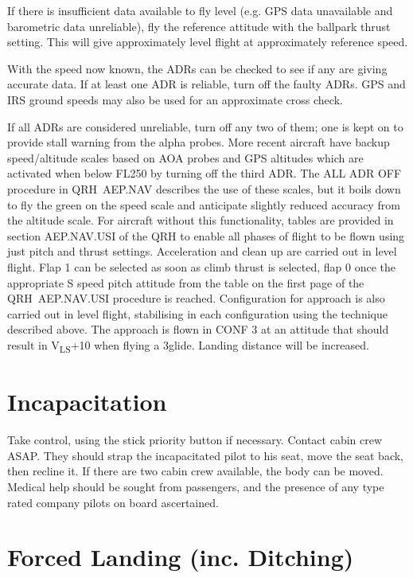 \documentclass[a5paper,11pt,twoside]{book}
\newcommand{\multicite}[1]{
  \nopagebreak
  \noindent{\footnotesize\color{blue}{[ #1 ]}}
}
\newcommand{\V}[1]{V\textsubscript{#1}}
\begin{document}
If there is insufficient data available to fly level (e.g. GPS data unavailable
and barometric data unreliable), fly the reference attitude with the ballpark
thrust setting. This will give approximately level flight at approximately
reference speed.

With the speed now known, the ADRs can be checked to see if any are giving
accurate data. If at least one ADR is reliable, turn off the faulty ADRs. GPS
and IRS ground speeds may also be used for an approximate cross check.

If all ADRs are considered unreliable, turn off any two of them; one is kept on
to provide stall warning from the alpha probes. More recent aircraft have backup
speed/altitude scales based on AOA probes and GPS altitudes which are activated
when below FL250 by turning off the third ADR. The ALL ADR OFF procedure in
QRH~AEP.NAV describes the use of these scales, but it boils down to fly the
green on the speed scale and anticipate slightly reduced accuracy from the
altitude scale.  For aircraft without this functionality, tables are provided in
section AEP.NAV.USI of the QRH to enable all phases of flight to be flown using
just pitch and thrust settings. Acceleration and clean up are carried out in
level flight. Flap 1 can be selected as soon as climb thrust is selected, flap 0
once the appropriate S speed pitch attitude from the table on the first page of
the QRH~AEP.NAV.USI procedure is reached. Configuration for approach is also
carried out in level flight, stabilising in each configuration using the
technique described above. The approach is flown in CONF 3 at an attitude that
should result in \V{LS}+10 when flying a 3\textdegree{ }glide. Landing distance
will be increased.

\multicite{QRH~AEP.NAV, FCOM~PRO.AEP.NAV, FCTM~PRO.AEP.NAV}

\section{Incapacitation}

Take control, using the stick priority button if necessary. Contact cabin crew ASAP. They
should strap the incapacitated pilot to his seat, move the seat back, then recline it. If there
are two cabin crew available, the body can be moved. Medical help should be sought from
passengers, and the presence of any type rated company pilots on board ascertained.

\multicite{FCTM~PRO.AEP.MISC}

\section{Forced Landing (inc. Ditching)}
\end{document}
